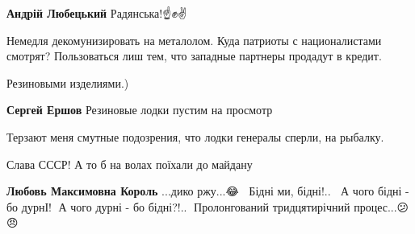 \begin{itemize}
\begin{itemize}
\textbf{Андрій Любецький}
Радянська!☝️\Laughey[1.0][white]✊✌️
\end{itemize}


Немедля декомунизировать на металолом. Куда патриоты с националистами смотрят?
Пользоваться лиш тем, что западные партнеры продадут в кредит.

\begin{itemize}
 
Резиновыми изделиями.)

 
\textbf{Сергей Ершов} Резиновые лодки пустим на просмотр

 
Терзают меня смутные подозрения, что лодки генералы сперли, на рыбалку.
\end{itemize}

 
Слава СССР! А то б на волах поїхали до майдану

\begin{itemize}
 
\textbf{Любовь Максимовна Король}
...дико ржу...😂🤭😬
Бідні ми, бідні!..🤪🙄
А чого бідні - бо дурнІ! 🤦А чого дурні - бо бідні?!..🤷 Пролонгований тридцятирічний процес...😕🥺😠


\end{itemize}
\end{itemize}

